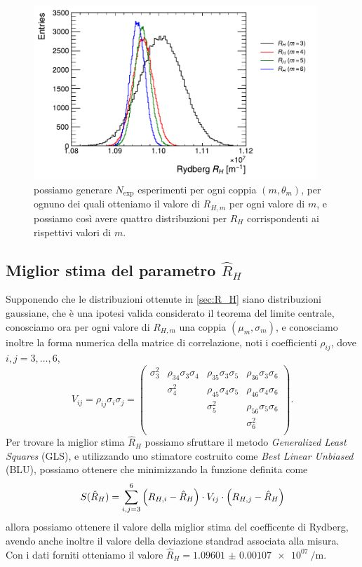 \documentclass[a4paper,aps,12pt,tightenlines]{revtex4-2}
\begin{document}
\begin{figure}
\centering
\includegraphics[width=10.7cm]{../figures_and_tests/rydberg.pdf}
\caption{possiamo generare $N_\text{exp}$ esperimenti per ogni coppia $(m, \theta_m)$, per ognuno dei quali otteniamo il valore di $R_{H,m}$ per ogni valore di $m$, e possiamo così avere quattro distribuzioni per $R_H$ corrispondenti ai rispettivi valori di $m$. \label{fig:rydberg}}
\end{figure}

\subsection{Miglior stima del parametro $\hat R_H$}
Supponendo che le distribuzioni ottenute in \autoref{sec:R_H} siano distribuzioni gaussiane, che è una ipotesi valida considerato il teorema del limite centrale, conosciamo ora per ogni valore di $R_{H,m}$ una coppia $(\mu_m, \sigma_m)$, e conosciamo inoltre la forma numerica della matrice di correlazione, noti i coefficienti $\rho_{ij}$, dove $i,j=3,\dots, 6$, \begin{equation}
V_{ij}=\rho_{ij}\sigma_i\sigma_j=\left(
\begin{matrix}
\sigma_3^2 & \rho_{34}\sigma_3\sigma_4 & \rho_{35}\sigma_3\sigma_5 & \rho_{36}\sigma_3\sigma_6 \\
& \sigma_4^2 & \rho_{45}\sigma_4\sigma_5 & \rho_{46}\sigma_4\sigma_6 \\
& & \sigma_5^2 & \rho_{56}\sigma_5\sigma_6 \\
& & & \sigma_6^2 \\
\end{matrix}
\right).
\end{equation} Per trovare la miglior stima $\hat R_H$ possiamo sfruttare il metodo \emph{Generalized Least Squares} (GLS), e utilizzando uno stimatore costruito come \emph{Best Linear Unbiased} (BLU), possiamo ottenere che minimizzando la funzione definita come \begin{equation} S(\hat R_H) = \sum_{i,j = 3}^6 \qty(R_{H,i} - \hat R_H)\cdot V_{ij} \cdot \qty(R_{H,j} - \hat R_H) \end{equation} allora possiamo ottenere il valore della miglior stima del coefficente di Rydberg, avendo anche inoltre il valore della deviazione standrad associata alla misura. Con i dati forniti otteniamo il valore $\hat R_H = \SI{1.09601(107)e+07}{\per\meter}$.







\end{document}
